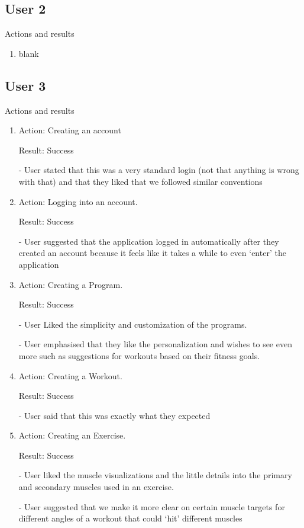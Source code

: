 \documentclass[12pt, titlepage]{article}
\begin{document}
\subsection{User 2}
Actions and results
\begin{enumerate}
	\item blank
\end{enumerate}

\subsection{User 3}
Actions and results
\begin{enumerate}
\item Action: Creating an account

Result:  Success

-	User stated that this was a very standard login (not that anything is wrong with that) and that they liked that we followed similar conventions

\item Action: Logging into an account.

Result: Success

-	User suggested that the application logged in automatically after they created an account because it feels like it takes a while to even ‘enter’ the application


\item Action: Creating a Program.

Result: Success

-	User Liked the simplicity and customization of the programs.

-	User emphasised that they like the personalization and wishes to see even more such as suggestions for workouts based on their fitness goals.


\item Action: Creating a Workout.

Result: Success

-	User said that this was exactly what they expected 

\item Action: Creating an Exercise.

Result: Success

-	User liked the muscle visualizations and the little details into the primary and secondary muscles used in an exercise.

-	User suggested that we make it more clear on certain muscle targets for different angles of a workout that could ‘hit’ different muscles



\end{enumerate}
\end{document}
